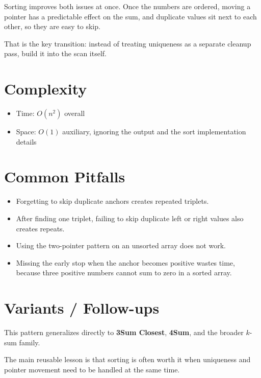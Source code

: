 Sorting improves both issues at once. Once the numbers are ordered, moving a pointer has a predictable effect on the sum, and duplicate values sit next to each other, so they are easy to skip.

That is the key transition: instead of treating uniqueness as a separate cleanup pass, build it into the scan itself.

\section{Complexity}
\begin{itemize}
\item Time: \(O(n^2)\) overall
\item Space: \(O(1)\) auxiliary, ignoring the output and the sort implementation details
\end{itemize}

\section{Common Pitfalls}
\begin{itemize}
\item Forgetting to skip duplicate anchors creates repeated triplets.
\item After finding one triplet, failing to skip duplicate left or right values also creates repeats.
\item Using the two-pointer pattern on an unsorted array does not work.
\item Missing the early stop when the anchor becomes positive wastes time, because three positive numbers cannot sum to zero in a sorted array.
\end{itemize}

\section{Variants / Follow-ups}
This pattern generalizes directly to \textbf{3Sum Closest}, \textbf{4Sum}, and the broader \(k\)-sum family.

The main reusable lesson is that sorting is often worth it when uniqueness and pointer movement need to be handled at the same time.

